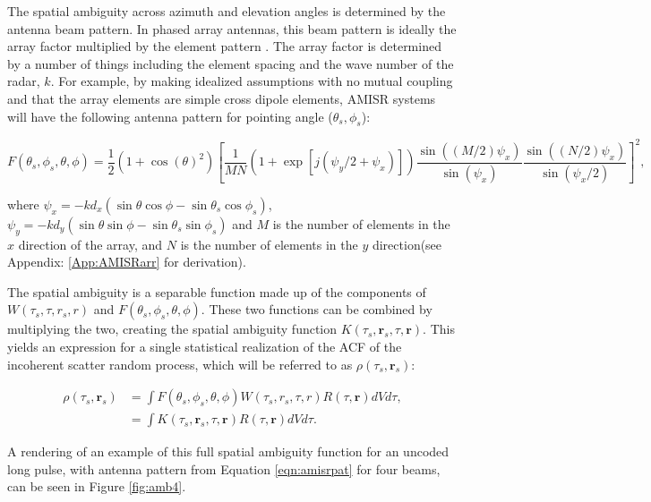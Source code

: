  
The spatial ambiguity across azimuth and elevation angles is determined by the antenna beam pattern. In phased array antennas, this beam pattern is ideally the array factor multiplied by the element pattern \cite{Balanis:2005:ATA:1208379}. The array factor is determined by a number of things including the element spacing and the wave number of the radar, $k$. For example, by making idealized assumptions with no mutual coupling and that the array elements are simple cross dipole elements, AMISR systems will have the following antenna pattern for pointing angle ($\theta_s,\phi_s$): 

 \begin{equation}
 \label{eqn:amisrpat}
F(\theta_s,\phi_s,\theta,\phi) = \frac{1}{2}(1+\cos(\theta)^2)\left[ \frac{1}{MN} \left(1+\exp\left[j(\psi_y/2 + \psi_x)\right]\right)\frac{\sin((M/2) \psi_x)}{\sin(\psi_x)} \frac{\sin((N/2) \psi_x)}{\sin(\psi_x/2)}\right]^2,
 \end{equation}
 
 \noindent where $\psi_x = -k d_x(\sin\theta\cos\phi-\sin\theta_s\cos\phi_s)$, $\psi_y = -k d_y(\sin\theta\sin\phi-\sin\theta_s\sin\phi_s)$ and $M$ is the number of elements in the $x$ direction of the array, and $N$ is the number of elements in the $y$ direction(see Appendix: \ref{App:AMISRarr} for derivation).


The spatial ambiguity is a separable function made up of the components of $W(\tau_s,\tau,r_s,r)$ and $F(\theta_s,\phi_s,\theta,\phi)$. These two functions can be combined by multiplying the two, creating the spatial ambiguity function  $K(\tau_s,\mathbf{r}_s,\tau,\mathbf{r})$. This yields an expression for a single statistical realization of the ACF of the incoherent scatter random process, which will be referred to as $\rho(\tau_s,\mathbf{r}_s)$:


 \begin{align}
  \label{eqn:volume}
\rho(\tau_s,\mathbf{r}_s) &= \int F(\theta_s,\phi_s,\theta,\phi)W(\tau_s,r_s,\tau,r) R(\tau,\mathbf{r}) dV d\tau ,\\
	&= \int K(\tau_s,\mathbf{r}_s,\tau,\mathbf{r}) R(\tau,\mathbf{r})  dVd\tau.
\end{align}

A rendering of an example of this full spatial ambiguity function for an uncoded long pulse, with antenna pattern from Equation \ref{eqn:amisrpat} for four beams, can be seen in Figure \ref{fig:amb4}.

